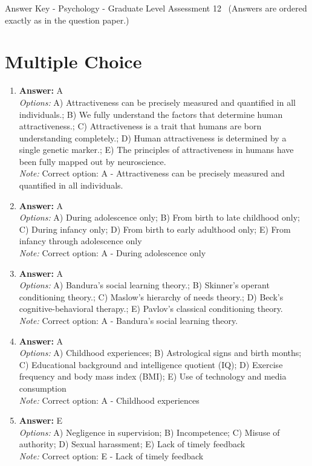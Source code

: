 \documentclass[12pt]{article}
\begin{document}
\begin{center}
Answer Key - Psychology - Graduate Level Assessment 12 \
\small (Answers are ordered exactly as in the question paper.)
\end{center}

\section*{Multiple Choice}
\begin{enumerate}[label=\arabic*.]
\item \textbf{Answer:} A
\\ \textit{Options:} A) Attractiveness can be precisely measured and quantified in all individuals.; B) We fully understand the factors that determine human attractiveness.; C) Attractiveness is a trait that humans are born understanding completely.; D) Human attractiveness is determined by a single genetic marker.; E) The principles of attractiveness in humans have been fully mapped out by neuroscience.
\\ \textit{Note:} Correct option: A - Attractiveness can be precisely measured and quantified in all individuals.
\item \textbf{Answer:} A
\\ \textit{Options:} A) During adolescence only; B) From birth to late childhood only; C) During infancy only; D) From birth to early adulthood only; E) From infancy through adolescence only
\\ \textit{Note:} Correct option: A - During adolescence only
\item \textbf{Answer:} A
\\ \textit{Options:} A) Bandura's social learning theory.; B) Skinner's operant conditioning theory.; C) Maslow's hierarchy of needs theory.; D) Beck's cognitive-behavioral therapy.; E) Pavlov's classical conditioning theory.
\\ \textit{Note:} Correct option: A - Bandura's social learning theory.
\item \textbf{Answer:} A
\\ \textit{Options:} A) Childhood experiences; B) Astrological signs and birth months; C) Educational background and intelligence quotient (IQ); D) Exercise frequency and body mass index (BMI); E) Use of technology and media consumption
\\ \textit{Note:} Correct option: A - Childhood experiences
\item \textbf{Answer:} E
\\ \textit{Options:} A) Negligence in supervision; B) Incompetence; C) Misuse of authority; D) Sexual harassment; E) Lack of timely feedback
\\ \textit{Note:} Correct option: E - Lack of timely feedback
\end{enumerate}
\end{document}
